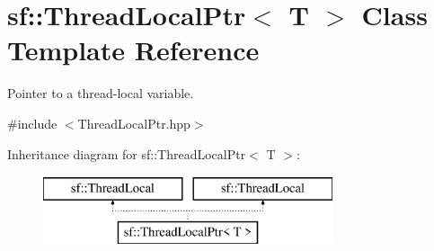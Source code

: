 \hypertarget{classsf_1_1_thread_local_ptr}{\section{sf\-:\-:Thread\-Local\-Ptr$<$ T $>$ Class Template Reference}
\label{classsf_1_1_thread_local_ptr}
}


Pointer to a thread-\/local variable.  




{\ttfamily \#include $<$Thread\-Local\-Ptr.\-hpp$>$}

Inheritance diagram for sf\-:\-:Thread\-Local\-Ptr$<$ T $>$\-:\begin{figure}[H]
\begin{center}
\leavevmode
\includegraphics[height=2.000000cm]{classsf_1_1_thread_local_ptr}
\end{center}
\end{figure}

